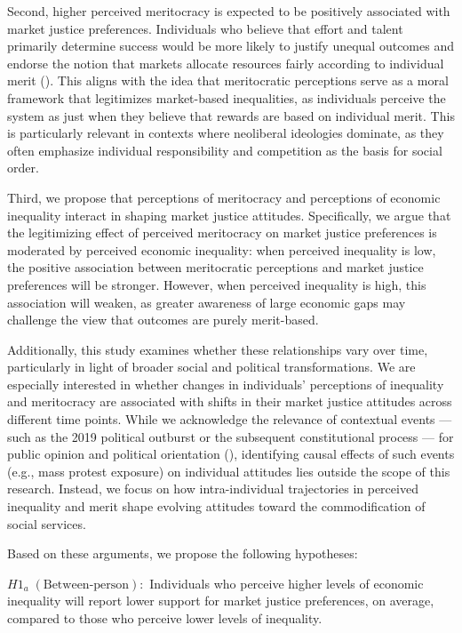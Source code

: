 \documentclass[
  12pt,
]{article}
\begin{document}
Second, higher perceived meritocracy is expected to be positively
associated with market justice preferences. Individuals who believe that
effort and talent primarily determine success would be more likely to
justify unequal outcomes and endorse the notion that markets allocate
resources fairly according to individual merit
().
This aligns with the idea that meritocratic perceptions serve as a moral
framework that legitimizes market-based inequalities, as individuals
perceive the system as just when they believe that rewards are based on
individual merit. This is particularly relevant in contexts where
neoliberal ideologies dominate, as they often emphasize individual
responsibility and competition as the basis for social order.

Third, we propose that perceptions of meritocracy and perceptions of
economic inequality interact in shaping market justice attitudes.
Specifically, we argue that the legitimizing effect of perceived
meritocracy on market justice preferences is moderated by perceived
economic inequality: when perceived inequality is low, the positive
association between meritocratic perceptions and market justice
preferences will be stronger. However, when perceived inequality is
high, this association will weaken, as greater awareness of large
economic gaps may challenge the view that outcomes are purely
merit-based.

Additionally, this study examines whether these relationships vary over
time, particularly in light of broader social and political
transformations. We are especially interested in whether changes in
individuals' perceptions of inequality and meritocracy are associated
with shifts in their market justice attitudes across different time
points. While we acknowledge the relevance of contextual events --- such
as the 2019 political outburst or the subsequent constitutional process
--- for public opinion and political orientation
(), identifying causal effects of such events (e.g., mass protest
exposure) on individual attitudes lies outside the scope of this
research. Instead, we focus on how intra-individual trajectories in
perceived inequality and merit shape evolving attitudes toward the
commodification of social services.

Based on these arguments, we propose the following hypotheses:

\(H1_{a} \; (\text{Between-person}):\) Individuals who perceive higher
levels of economic inequality will report lower support for market
justice preferences, on average, compared to those who perceive lower
levels of inequality.
\end{document}
